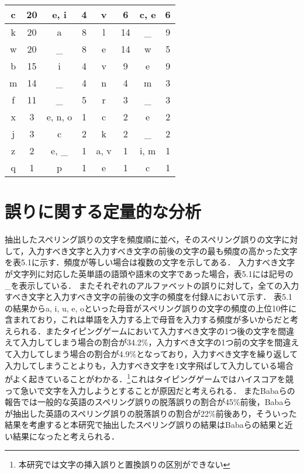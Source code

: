 {\begin{table*}[t]
\begin{center}
\begin{tabular}{|c|c|c|c|c|c|c|c|}
	    c & 20 & e, i & 4 & v & 6 & c, e & 6\\ \hline
	    k & 20 & a & 8 & l & 14 & \_ & 9\\ \hline
	    w & 20 & \_ & 8 & e & 14 & w & 5\\ \hline
	    b & 15 & i & 4 & v & 9 & e & 9\\ \hline
	    m & 14 & \_ & 4 & n & 4 & m & 3\\ \hline
	    f & 11 & \_ & 5 & r & 3 & \_ & 3\\ \hline
	    x & 3 & e, n, o & 1 & c & 2 & e & 2\\ \hline
	    j & 3 & c & 2 & k & 2 & \_ & 2\\ \hline
	    z & 2 & e, \_ & 1 & a, v & 1 & i, m & 1\\ \hline
	    q & 1 & p & 1 & e & 1 & c & 1\\ \hline
   \end{tabular}
  \end{center}
 \end{table*}
}
 
\section{誤りに関する定量的な分析}
抽出したスペリング誤りの文字を頻度順に並べ，そのスペリング誤りの文字に対して，入力すべき文字と入力すべき文字の前後の文字の最も頻度の高かった文字を表5.1に示す．頻度が等しい場合は複数の文字を示してある．
入力すべき文字が文字列に対応した英単語の語頭や語末の文字であった場合，表5.1には記号の\_を表示している．
またそれぞれのアルファベットの誤りに対して，全ての入力すべき文字と入力すべき文字の前後の文字の頻度を付録Aにおいて示す．
表5.1の結果からa, i, u, e, oといった母音がスペリング誤りの文字の頻度の上位10件に含まれており，これは単語を入力する上で母音を入力する頻度が多いからだと考えられる．またタイピングゲームにおいて入力すべき文字の1つ後の文字を間違えて入力してしまう場合の割合が34.2\%，入力すべき文字の1つ前の文字を間違えて入力してしまう場合の割合が4.9\%となっており，入力すべき文字を繰り返して入力してしまうことよりも，入力すべき文字を1文字飛ばして入力している場合がよく起きていることがわかる．\footnote{本研究では文字の挿入誤りと置換誤りの区別ができない}これはタイピングゲームではハイスコアを競って急いで文字を入力しようとすることが原因だと考えられる．
またBabaらの報告\cite{babaACL2012}では一般的な英語のスペリング誤りの脱落誤りの割合が45\%前後，Babaらが抽出した英語のスペリング誤りの脱落誤りの割合が22\%前後あり，そういった結果を考慮すると本研究で抽出したスペリング誤りの結果はBabaらの結果と近い結果になったと考えられる．


